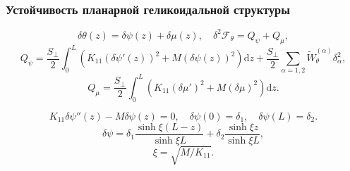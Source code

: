 \documentclass[utf8,secheader]{beamer}
\newcommand{\FF}{\mathcal{F}}
\begin{document}
\begin{frame}
\frametitle{Устойчивость планарной геликоидальной структуры}

\begin{block}{ }
$$
\delta\theta(z) = \delta\psi(z) + \delta\mu(z),\quad\delta^2 \FF_\theta = Q_\psi + Q_\mu,
$$
\begin{equation}\label{Qdelta0}
Q_\psi= \frac{S_\bot}{2}\int_{0}^{L}\left(K_{11}(\delta\psi'(z))^2+M(\delta\psi(z))^2\right)\mathrm{d}z + \frac{S_\bot}{2}\sum_{\alpha=1,2}\widetilde{W}_\theta^{(\alpha)}\delta_\alpha^2,
\end{equation}
\begin{equation}\label{Qmu}
Q_\mu=\frac{S_\bot}{2}\int_{0}^{L}\left(K_{11}(\delta\mu')^2+M(\delta\mu)^2\right)\mathrm{d}z.
\end{equation}
\end{block}


\begin{block}{ }
$$
K_{11} \delta\psi''(z) - M\delta\psi(z) = 0,\quad \delta\psi(0) = \delta_1,\quad \delta\psi(L) = \delta_2.
$$
\begin{equation}\label{psi=}
\delta\psi =
\displaystyle\delta_1\frac{\sinh \xi(L-z)}{\sinh\xi L}+\delta_2\frac{\sinh\xi z}{\sinh\xi L},
\end{equation}
$$\xi = \sqrt{M/K_{11}}.$$
\end{block}
\end{frame}


\end{document}
